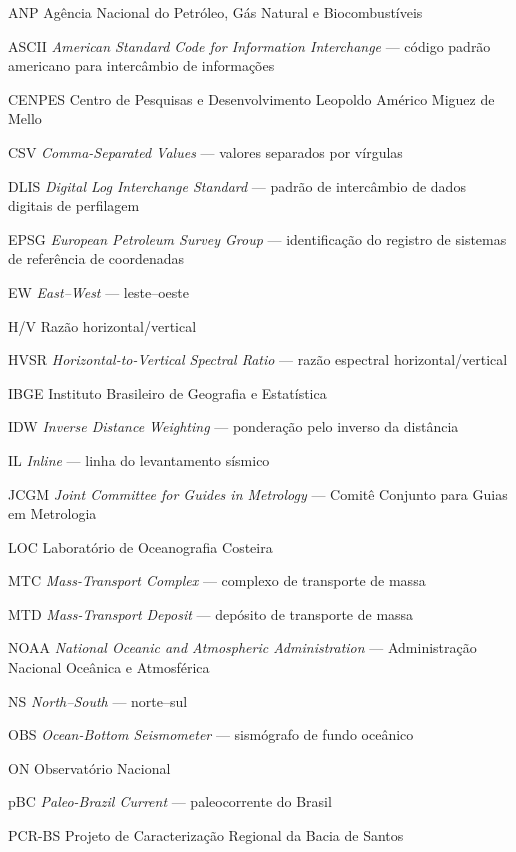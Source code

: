 \begin{siglas}
  \item[ANP] Agência Nacional do Petróleo, Gás Natural e Biocombustíveis
  \item[ASCII] \textit{American Standard Code for Information Interchange} — código padrão americano para intercâmbio de informações
  \item[CENPES] Centro de Pesquisas e Desenvolvimento Leopoldo Américo Miguez de Mello
  \item[CSV] \textit{Comma-Separated Values} — valores separados por vírgulas
  \item[DLIS] \textit{Digital Log Interchange Standard} — padrão de intercâmbio de dados digitais de perfilagem
  \item[EPSG] \textit{European Petroleum Survey Group} — identificação do registro de sistemas de referência de coordenadas
  \item[EW] \textit{East--West} — leste--oeste
  \item[H/V] Razão horizontal/vertical
  \item[HVSR] \textit{Horizontal-to-Vertical Spectral Ratio} — razão espectral horizontal/vertical
  \item[IBGE] Instituto Brasileiro de Geografia e Estatística
  \item[IDW] \textit{Inverse Distance Weighting} — ponderação pelo inverso da distância
  \item[IL] \textit{Inline} — linha do levantamento sísmico
  \item[JCGM] \textit{Joint Committee for Guides in Metrology} — Comitê Conjunto para Guias em Metrologia
  \item[LOC] Laboratório de Oceanografia Costeira
  \item[MTC] \textit{Mass-Transport Complex} — complexo de transporte de massa
  \item[MTD] \textit{Mass-Transport Deposit} — depósito de transporte de massa
  \item[NOAA] \textit{National Oceanic and Atmospheric Administration} — Administração Nacional Oceânica e Atmosférica
  \item[NS] \textit{North--South} — norte--sul
  \item[OBS] \textit{Ocean-Bottom Seismometer} — sismógrafo de fundo oceânico
  \item[ON] Observatório Nacional
  \item[pBC] \textit{Paleo-Brazil Current} — paleocorrente do Brasil
  \item[PCR-BS] Projeto de Caracterização Regional da Bacia de Santos

\end{siglas}
